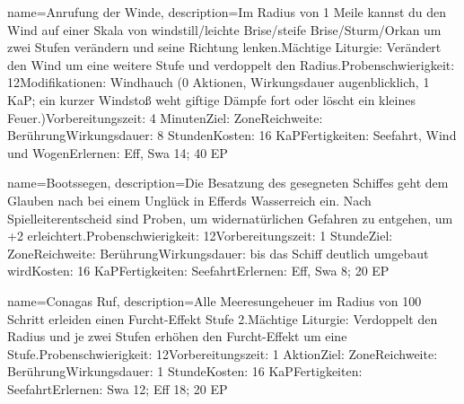 {
    name={Anrufung der Winde},
    description={Im Radius von 1 Meile kannst du den Wind auf einer Skala von windstill/leichte Brise/steife Brise/Sturm/Orkan um zwei Stufen verändern und seine Richtung lenken.\newline Mächtige Liturgie: Verändert den Wind um eine weitere Stufe und verdoppelt den Radius.\newline Probenschwierigkeit: 12\newline Modifikationen: Windhauch (0 Aktionen, Wirkungsdauer augenblicklich, 1 KaP; ein kurzer Windstoß weht giftige Dämpfe fort oder löscht ein kleines Feuer.)\newline Vorbereitungszeit: 4 Minuten\newline Ziel: Zone\newline Reichweite: Berührung\newline Wirkungsdauer: 8 Stunden\newline Kosten: 16 KaP\newline Fertigkeiten: Seefahrt, Wind und Wogen\newline Erlernen: Eff, Swa 14; 40 EP}
}


{
    name={Bootssegen},
    description={Die Besatzung des gesegneten Schiffes geht  dem Glauben nach bei einem Unglück in Efferds Wasserreich ein. Nach Spielleiterentscheid sind Proben, um widernatürlichen Gefahren zu entgehen, um +2 erleichtert.\newline Probenschwierigkeit: 12\newline Vorbereitungszeit: 1 Stunde\newline Ziel: Zone\newline Reichweite: Berührung\newline Wirkungsdauer: bis das Schiff deutlich umgebaut wird\newline Kosten: 16 KaP\newline Fertigkeiten: Seefahrt\newline Erlernen: Eff, Swa 8; 20 EP}
}


{
    name={Conagas Ruf},
    description={Alle Meeresungeheuer im Radius von 100 Schritt erleiden einen Furcht-Effekt Stufe 2.\newline Mächtige Liturgie: Verdoppelt den Radius und je zwei Stufen erhöhen den Furcht-Effekt um eine Stufe.\newline Probenschwierigkeit: 12\newline Vorbereitungszeit: 1 Aktion\newline Ziel: Zone\newline Reichweite: Berührung\newline Wirkungsdauer: 1 Stunde\newline Kosten: 16 KaP\newline Fertigkeiten: Seefahrt\newline Erlernen: Swa 12; Eff 18; 20 EP}
}


